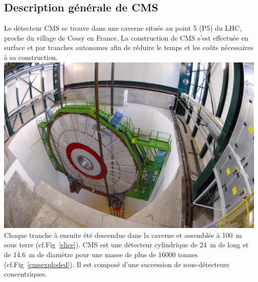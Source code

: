 \subsection{Description générale de CMS}
Le détecteur CMS se trouve dans une caverne située au point \num{5} (P5) du LHC, proche du village de Cessy en France. La construction de CMS s'est effectuée en surface et par tranches autonomes afin de réduire le temps et les coûts nécessaires à sa construction.
\marginpar
{
	\centering
	\includegraphics[width=\marginparwidth]{CMS/slice.jpg}
	\label{slice}
}
Chaque tranche à ensuite été descendue dans la caverne et assemblée à \SI{100}{\meter} sous terre (cf.Fig~\ref{slice}).
CMS est une détecteur cylindrique de \SI{24}{\meter} de long et de \SI{14.6}{\meter} de diamètre pour une masse de plus de \num{16000} tonnes (cf.Fig~\ref{cmsexploded}). Il est composé d'une succession de sous-détecteurs concentriques.

